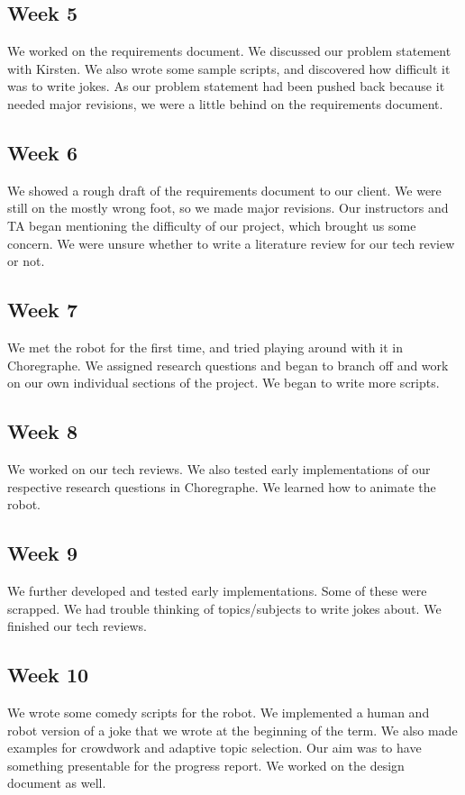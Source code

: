 \documentclass[onecolumn, draftclsnofoot,10pt, compsoc]{IEEEtran}
\begin{document}
\subsection{Week 5}
We worked on the requirements document. We discussed our problem statement with Kirsten. We also wrote some sample scripts, and discovered how difficult it was to write jokes. As our problem statement had been pushed back because it needed major revisions, we were a little behind on the requirements document.
\subsection{Week 6}
We showed a rough draft of the requirements document to our client. We were still on the mostly wrong foot, so we made major revisions. Our instructors and TA began mentioning the difficulty of our project, which brought us some concern. We were unsure whether to write a literature review for our tech review or not.
\subsection{Week 7}
We met the robot for the first time, and tried playing around with it in Choregraphe. We assigned research questions and began to branch off and work on our own individual sections of the project. We began to write more scripts.
\subsection{Week 8}
We worked on our tech reviews. We also tested early implementations of our respective research questions in Choregraphe. We learned how to animate the robot.
\subsection{Week 9}
We further developed and tested early implementations. Some of these were scrapped. We had trouble thinking of topics/subjects to write jokes about. We finished our tech reviews.
\subsection{Week 10}
We wrote some comedy scripts for the robot. We implemented a human and robot version of a joke that we wrote at the beginning of the term. We also made examples for crowdwork and adaptive topic selection. Our aim was to have something presentable for the progress report. We worked on the design document as well.
\end{document}

